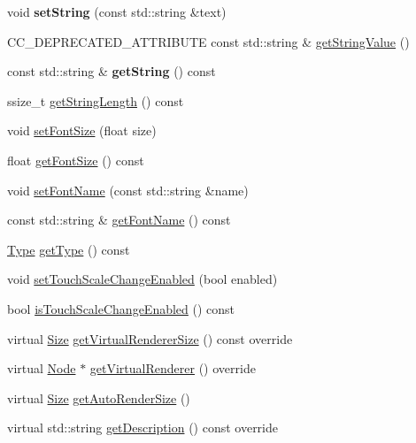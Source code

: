 \begin{DoxyCompactItemize}
\item 
\mbox{\label{classui_1_1Text_ae8a98dc6bd807b2caa912e6953fe45cb}} 
void {\bfseries set\+String} (const std\+::string \&text)
\item 
C\+C\+\_\+\+D\+E\+P\+R\+E\+C\+A\+T\+E\+D\+\_\+\+A\+T\+T\+R\+I\+B\+U\+TE const std\+::string \& \hyperlink{classui_1_1Text_af96f13417b0e3369f241917a6ea52b9e}{get\+String\+Value} ()
\item 
\mbox{\label{classui_1_1Text_a38c6707a1b67175db6f2b0c6708232fe}} 
const std\+::string \& {\bfseries get\+String} () const
\item 
ssize\+\_\+t \hyperlink{classui_1_1Text_aa92e49b93209c7277f23c11ced33c2c1}{get\+String\+Length} () const
\item 
void \hyperlink{classui_1_1Text_a4850471cc893370ee86d77ffc89456fb}{set\+Font\+Size} (float size)
\item 
float \hyperlink{classui_1_1Text_a009d2ccada317ece8824fe3ad553f309}{get\+Font\+Size} () const
\item 
void \hyperlink{classui_1_1Text_abb05f9c986458b8c5e4e29c82c1628c2}{set\+Font\+Name} (const std\+::string \&name)
\item 
const std\+::string \& \hyperlink{classui_1_1Text_aabb9872206c0304121dec048a4ef6bf0}{get\+Font\+Name} () const
\item 
\hyperlink{classui_1_1Text_a66074a2bf4b155f85115f944c6ff01ed}{Type} \hyperlink{classui_1_1Text_a09ed772f6954925301be452daedd882e}{get\+Type} () const
\item 
void \hyperlink{classui_1_1Text_a25d9a398ee8d5e354765a67ae0b1926b}{set\+Touch\+Scale\+Change\+Enabled} (bool enabled)
\item 
bool \hyperlink{classui_1_1Text_abb93684d87f2267726088ecc0beb96e4}{is\+Touch\+Scale\+Change\+Enabled} () const
\item 
virtual \hyperlink{classSize}{Size} \hyperlink{classui_1_1Text_a1a610c3ab53ff659e0f1b9071245bbc1}{get\+Virtual\+Renderer\+Size} () const override
\item 
virtual \hyperlink{classNode}{Node} $\ast$ \hyperlink{classui_1_1Text_ab595ff0bd28a29005e7f60ea662e7640}{get\+Virtual\+Renderer} () override
\item 
virtual \hyperlink{classSize}{Size} \hyperlink{classui_1_1Text_ad7710a33d6c830e9a91d256cac445b08}{get\+Auto\+Render\+Size} ()
\item 
virtual std\+::string \hyperlink{classui_1_1Text_ac554a5ade84b530bb1a4e45a1744ceb6}{get\+Description} () const override

\end{DoxyCompactItemize}
